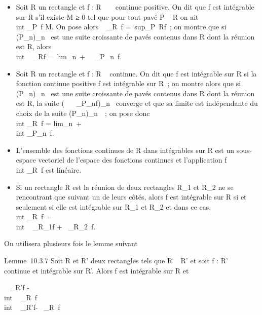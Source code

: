\documentclass[]{article}
\begin{document}
\begin{itemize}
\itemsep1pt\parskip0pt
\item
  Soit R un rectangle et f : R \rightarrow~ ~ continue positive. On dit que f est
  intégrable sur R s'il existe M ≥ 0 tel que pour tout pavé P \subset~ R on ait
  \int  \\int  \_P~f
  \leq M. On pose alors \int ~
  \int  \_R~f =\
  sup\_P\subset~Rf~; on montre que si (P\_n)\_n\in{}~ est
  une suite croissante de pavés contenus dans R dont la réunion est R,
  alors \int  \\int ~
  \_Rf =\
  lim\_n\rightarrow~+\infty~\int ~
  \int  \_P\_n~f.
\item
  Soit R un rectangle et f : R \rightarrow~  continue. On dit que f est intégrable
  sur R si la fonction continue positive \textbar{}f\textbar{} est
  intégrable sur R~; on montre alors que si (P\_n)\_n\in\mathbb{N}~
  est une suite croissante de pavés contenus dans R dont la réunion est
  R, la suite \left (\int ~
  \int ~
  \_P\_nf\right )\_n\in{}~ converge et
  que sa limite est indépendante du choix de la suite
  (P\_n)\_n\in\mathbb{N}~~; on pose donc \\int
   \int  \_R~f
  = lim\_n\rightarrow~+\infty~~\\int
   \int  \_P\_n~f.
\item
  L'ensemble des fonctions continues de R dans  intégrables sur R est
  un sous-espace vectoriel de l'espace des fonctions continues et
  l'application f\mapsto~\\int
   \int  \_R~f est linéaire.
\item
  Si un rectangle R est la réunion de deux rectangles R\_1 et
  R\_2 ne se rencontrant que suivant un de leurs côtés, alors f
  est intégrable sur R si et seulement si elle est intégrable sur
  R\_1 et R\_2 et dans ce cas, \\int
   \int  \_R~f
  =\int  \\int ~
  \_R\_1f +\int ~
  \int  \_R\_2~f.
\end{itemize}

On utilisera plusieurs fois le lemme suivant

Lemme~10.3.7 Soit R et R' deux rectangles tels que R \subset~ R' et soit f : R'
\rightarrow~  continue et intégrable sur R'. Alors f est intégrable sur R et

\left \textbar{}\int ~
\int  \_R'f -\\int ~
\int  \_R~f\right
\textbar{}\leq\int  \\int ~
\_R'\textbar{}f\textbar{}-\int ~
\int  \_R~\textbar{}f\textbar{}
\end{document}
